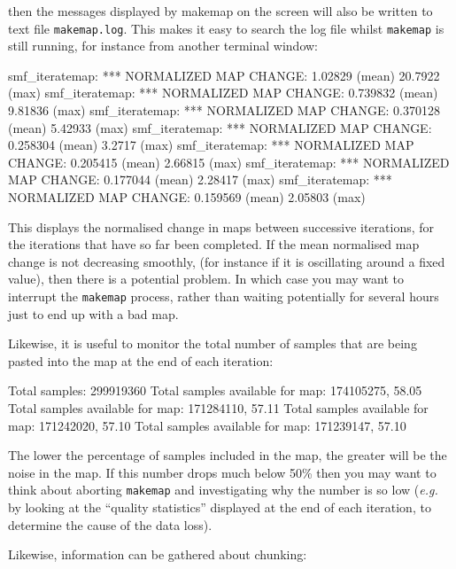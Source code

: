 \begin{terminalv}
then the messages displayed by makemap on the screen will also be written
to text file \texttt{makemap.log}. This makes it easy to search the log
file whilst \texttt{makemap} is still running, for instance from another terminal
window:

\begin{terminalv}
smf_iteratemap: *** NORMALIZED MAP CHANGE: 1.02829 (mean) 20.7922 (max)
smf_iteratemap: *** NORMALIZED MAP CHANGE: 0.739832 (mean) 9.81836 (max)
smf_iteratemap: *** NORMALIZED MAP CHANGE: 0.370128 (mean) 5.42933 (max)
smf_iteratemap: *** NORMALIZED MAP CHANGE: 0.258304 (mean) 3.2717 (max)
smf_iteratemap: *** NORMALIZED MAP CHANGE: 0.205415 (mean) 2.66815 (max)
smf_iteratemap: *** NORMALIZED MAP CHANGE: 0.177044 (mean) 2.28417 (max)
smf_iteratemap: *** NORMALIZED MAP CHANGE: 0.159569 (mean) 2.05803 (max)
\end{terminalv}

This displays the normalised change in maps between successive
iterations, for the iterations that have so far been completed. If the mean
normalised map change is not decreasing smoothly,
(for instance if it is oscillating around a fixed value), then there is a
potential problem. In which case you may want to interrupt the
\texttt{makemap} process, rather than waiting potentially for several
hours just to end up with a bad map.

Likewise, it is useful to monitor the total number of samples that are
being pasted into the map at the end of each iteration:

\begin{terminalv}
Total samples: 299919360
Total samples available for map:  174105275, 58.05%
Total samples available for map:  171284110, 57.11%
Total samples available for map:  171242020, 57.10%
Total samples available for map:  171239147, 57.10%
\end{terminalv}

The lower the percentage of samples included in the map, the greater will
be the noise in the map. If this number drops much below 50\% then you
may want to think about aborting \texttt{makemap} and investigating why
the number is so low (\emph{e.g.} by looking at the ``quality
statistics'' displayed at the end of each iteration, to determine the
cause of the data loss).

Likewise, information can be gathered about chunking:


\end{terminalv}
